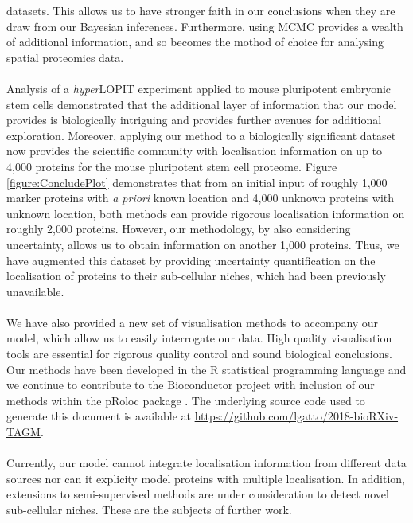 \documentclass[12pt,english]{article}\usepackage[]{graphicx}\usepackage[]{color}
\begin{document}
datasets. This allows us to have stronger faith in our conclusions
when they are draw from our Bayesian inferences. Furthermore, using
MCMC provides a wealth of additional information, and so becomes the
mothod of choice for analysing spatial proteomics data.
\\
\\
Analysis of a \textit{hyper}LOPIT experiment applied to mouse
pluripotent embryonic stem cells demonstrated that the additional
layer of information that our model provides is biologically
intriguing and provides further avenues for additional
exploration. Moreover, applying our method to a biologically
significant dataset now provides the scientific community with
localisation information on up to 4,000 proteins for the mouse
pluripotent stem cell proteome. Figure \ref{figure:ConcludePlot}
demonstrates that from an initial input of roughly 1,000 marker
proteins with \textit{a priori} known location and 4,000 unknown
proteins with unknown location, both methods can provide rigorous
localisation information on roughly 2,000 proteins. However, our
methodology, by also considering uncertainty, allows us to obtain
information on another 1,000 proteins.  Thus, we have augmented this
dataset by providing uncertainty quantification on the localisation of
proteins to their sub-cellular niches, which had been previously
unavailable.
\\
\\
We have also provided a new set of visualisation methods to accompany
our model, which allow us to easily interrogate our data. High quality
visualisation tools are essential for rigorous quality control and
sound biological conclusions.  Our methods have been developed in the
R statistical programming language and we continue to contribute to
the Bioconductor project \citep{Bioconductor::2004, Huber::2015} with
inclusion of our methods within the pRoloc package
\citep{pRoloc:2014}. The underlying source code used to generate this
document is available at
\url{https://github.com/lgatto/2018-bioRXiv-TAGM}.
\\
\\
Currently, our model cannot integrate localisation information from
different data sources nor can it explicity model proteins with
multiple localisation. In addition, extensions to semi-supervised
methods are under consideration to detect novel sub-cellular
niches. These are the subjects of further work.
\end{document}
